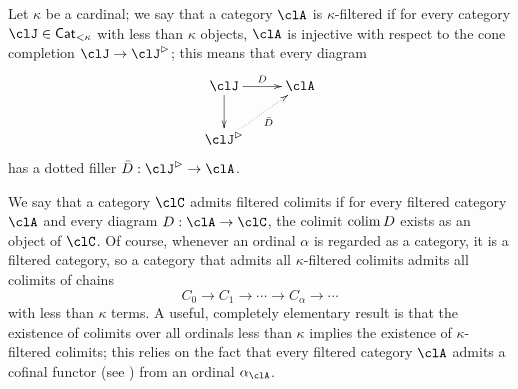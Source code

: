 Let $\kappa$ be a cardinal; we say that a category $\clA$ is $\kappa$\hyp{}filtered if for every category $\clJ\in\Cat_{<\kappa}$ with less than $\kappa$ objects, $\clA$ is injective with respect to the cone completion $\clJ\to \clJ^\rhd$; this means that every diagram
\[
	\vcenter{\xymatrix{
			\clJ\ar[d]\ar[r]^D & \clA \\
			\clJ^\rhd\ar@{.>}[ur]_{\bar D}
		}}
\]
has a dotted filler $\bar D : \clJ^\rhd \to \clA$.

We say that a category $\clC$ admits filtered colimits if for every filtered category $\clA$ and every diagram $D : \clA \to \clC$, the colimit $\operatorname{colim} D$ exists as an object of $\clC$. Of course, whenever an ordinal $\alpha$ is regarded as a category, it is a filtered category, so a category that admits all $\kappa$\hyp{}filtered colimits admits all colimits of chains
\[
	C_0 \to C_1 \to \cdots \to C_\alpha \to\cdots
\]
with less than $\kappa$ terms. A useful, completely elementary result is that the existence of colimits over all ordinals less than $\kappa$ implies the existence of $\kappa$\hyp{}filtered colimits; this relies on the fact that every filtered category $\clA$ admits a cofinal functor (see \cite[]{Bor1}) from an ordinal $\alpha_\clA$.

